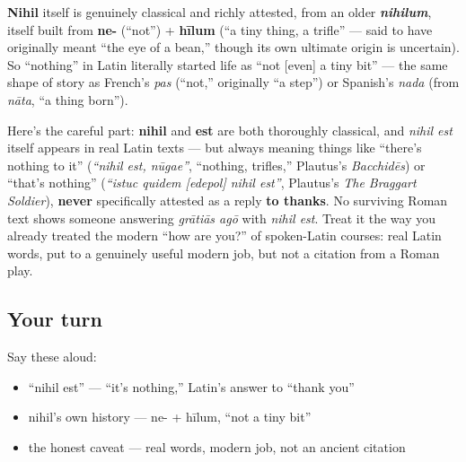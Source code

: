 \begin{cousinweb}
\textbf{Nihil} itself is genuinely classical and richly attested, from an older \emph{\textbf{nihilum}}, itself built from \textbf{ne-} (\textquotedblleft{}not\textquotedblright{}) + \textbf{hīlum} (\textquotedblleft{}a tiny thing, a trifle\textquotedblright{} — said to have originally meant \textquotedblleft{}the eye of a bean,\textquotedblright{} though its own ultimate origin is uncertain). So \textquotedblleft{}nothing\textquotedblright{} in Latin literally started life as \textquotedblleft{}not {[}even{]} a tiny bit\textquotedblright{} — the same shape of story as French's \emph{pas} (\textquotedblleft{}not,\textquotedblright{} originally \textquotedblleft{}a step\textquotedblright{}) or Spanish's \emph{nada} (from \emph{nāta}, \textquotedblleft{}a thing born\textquotedblright{}).
\end{cousinweb}

\begin{culture}
Here's the careful part: \textbf{nihil} and \textbf{est} are both thoroughly classical, and \emph{nihil est} itself appears in real Latin texts — but always meaning things like \textquotedblleft{}there's nothing to it\textquotedblright{} (\emph{\textquotedblleft{}nihil est, nūgae\textquotedblright{}}, \textquotedblleft{}nothing, trifles,\textquotedblright{} Plautus's \emph{Bacchidēs}) or \textquotedblleft{}that's nothing\textquotedblright{} (\emph{\textquotedblleft{}istuc quidem {[}edepol{]} nihil est\textquotedblright{}}, Plautus's \emph{The Braggart Soldier}), \textbf{never} specifically attested as a reply \textbf{to thanks}. No surviving Roman text shows someone answering \emph{grātiās agō} with \emph{nihil est}. Treat it the way you already treated the modern \textquotedblleft{}how are you?\textquotedblright{} of spoken-Latin courses: real Latin words, put to a genuinely useful modern job, but not a citation from a Roman play.
\end{culture}

\subsection*{Your turn}
Say these aloud:

\begin{itemize}
\raggedright
  \item \textquotedblleft{}nihil est\textquotedblright{} — \textquotedblleft{}it's nothing,\textquotedblright{} Latin's answer to \textquotedblleft{}thank you\textquotedblright{}
  \item nihil's own history — ne- + hīlum, \textquotedblleft{}not a tiny bit\textquotedblright{}
  \item the honest caveat — real words, modern job, not an ancient citation
\end{itemize}

